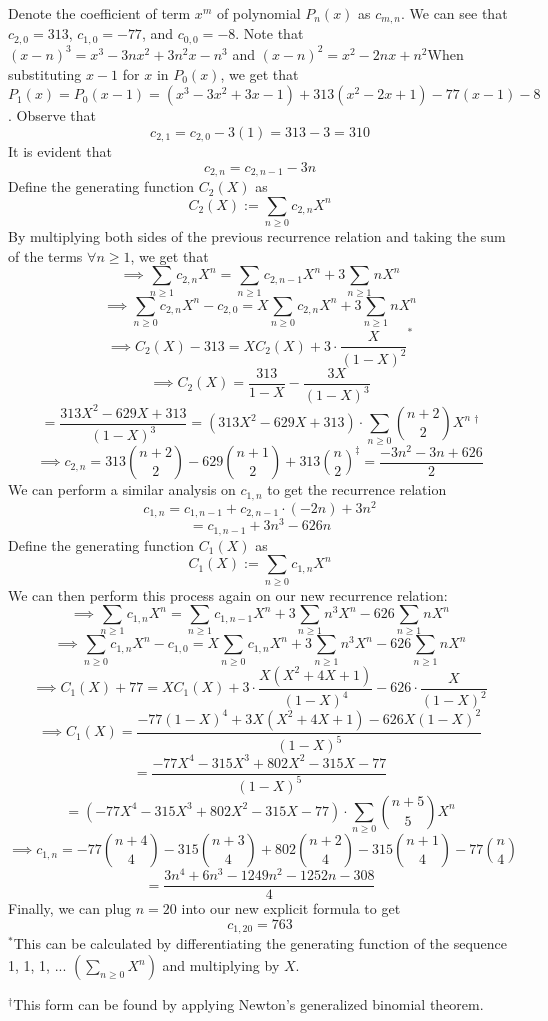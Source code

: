 \begin{enumerate}
Denote the coefficient of term $x^m$ of polynomial $P_n(x)$ as $c_{m, n}$. We can see that $c_{2, 0} = 313$, $c_{1, 0} = -77$, and $c_{0, 0} = -8$. Note that $(x-n)^3 = x^3-3nx^2+3n^2x-n^3$ and $(x-n)^2 = x^2-2nx+n^2$When substituting $x-1$ for $x$ in $P_0(x)$, we get that $P_1(x) = P_0(x-1) = (x^3-3x^2+3x-1) + 313(x^2-2x+1) -77(x-1) -8$. Observe that
 \[c_{2,1} = c_{2,0} - 3(1) = 313 - 3 = 310\]It is evident that
 \[c_{2,n} = c_{2,n-1} - 3n\]Define the generating function $C_2(X)$ as
 \[C_2(X) := \sum_{n \geq 0} c_{2,n}X^n\]By multiplying both sides of the previous recurrence relation and taking the sum of the terms $\forall n\geq 1$, we get that
 \[\implies \sum_{n\geq1} c_{2,n}X^n = \sum_{n\geq1}c_{2,n-1}X^n + 3\sum_{n\geq1}nX^n\]
 \[\implies \sum_{n\geq0} c_{2,n}X^n - c_{2,0} = X\sum_{n\geq0}c_{2,n}X^n + 3\sum_{n\geq1}nX^n\]
 \[\implies C_2(X) - 313 = XC_2(X) + 3\cdot \frac{X}{(1-X)^2}^*\]
 \[\implies C_2(X) = \frac{313}{1-X} - \frac{3X}{(1-X)^3}\]
 \[= \frac{313X^2 - 629X + 313}{(1-X)^3} = (313X^2 - 629X + 313) \cdot \sum_{n\geq0}{n+2 \choose 2}X^n\ ^\dagger\]
 \[\implies c_{2,n} = 313{n+2 \choose 2} - 629{n+1 \choose 2} + 313{n \choose 2}^\ddagger = \frac{-3n^2 - 3n + 626}{2}\]We can perform a similar analysis on $c_{1,n}$ to get the recurrence relation
 \[c_{1,n} = c_{1, n-1} + c_{2,n-1}\cdot(-2n) + 3n^2\]
 \[= c_{1, n-1} +3n^3 - 626n\] Define the generating function $C_1(X)$ as
 \[C_1(X) := \sum_{n\geq0}c_{1,n}X^n\]We can then perform this process again on our new recurrence relation:
 \[\implies \sum_{n\geq1} c_{1,n}X^n = \sum_{n\geq1}c_{1,n-1}X^n + 3\sum_{n\geq1}n^3X^n - 626\sum_{n\geq1}nX^n\]
 \[\implies \sum_{n\geq0} c_{1,n}X^n - c_{1,0} = X\sum_{n\geq0}c_{1,n}X^n + 3\sum_{n\geq1}n^3X^n - 626\sum_{n\geq1}nX^n\]
 \[\implies C_1(X) + 77 = XC_1(X) + 3\cdot \frac{X(X^2+4X+1)}{(1-X)^4} - 626\cdot \frac{X}{(1-X)^2}\]
 \[\implies C_1(X) = \frac{-77(1-X)^4 + 3X(X^2+4X+1) - 626X(1-X)^2}{(1-X)^5}\]
 \[= \frac{-77X^4-315X^3+802X^2-315X-77}{(1-X)^5}\]
 \[=(-77X^4-315X^3+802X^2-315X-77) \cdot \sum_{n\geq0}{n+5 \choose 5}X^n\]
 \[\implies c_{1,n} = -77{n+4 \choose 4} - 315{n+3 \choose 4} + 802{n+2 \choose 4} - 315{n+1 \choose 4} -77{n \choose 4}\]
 \[= \frac{3n^4+6n^3-1249n^2-1252n-308}{4}\]Finally, we can plug $n=20$ into our new explicit formula to get 
 \[c_{1,20} = \boxed{763}\]$^*$This can be calculated by differentiating the generating function of the sequence 1, 1, 1, ... $(\sum_{n\geq0}X^n)$ and multiplying by $X$.

 $^\dagger$This form can be found by applying Newton's generalized binomial theorem.


\end{enumerate}
